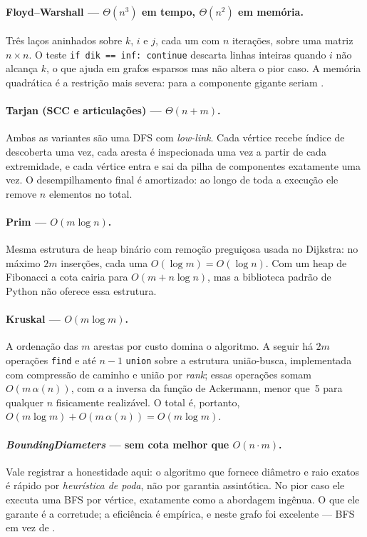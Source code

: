 \documentclass[sigconf]{webmedia}
\begin{document}
\paragraph{Floyd--Warshall --- $\Theta(n^3)$ em tempo, $\Theta(n^2)$ em
memória.} Três laços aninhados sobre $k$, $i$ e $j$, cada um com $n$
iterações, sobre uma matriz $n \times n$. O teste
\texttt{if dik == inf: continue} descarta linhas inteiras quando $i$ não
alcança $k$, o que ajuda em grafos esparsos mas não altera o pior caso.
A memória quadrática é a restrição mais severa: para a componente gigante
seriam \fwMemoria.

\paragraph{Tarjan (SCC e articulações) --- $\Theta(n+m)$.} Ambas as
variantes são uma DFS com \textit{low-link}. Cada vértice recebe índice
de descoberta uma vez, cada aresta é inspecionada uma vez a partir de
cada extremidade, e cada vértice entra e sai da pilha de componentes
exatamente uma vez. O desempilhamento final é amortizado: ao longo de
toda a execução ele remove $n$ elementos no total.

\paragraph{Prim --- $O(m\log n)$.} Mesma estrutura de heap binário com
remoção preguiçosa usada no Dijkstra: no máximo $2m$ inserções, cada uma
$O(\log m) = O(\log n)$. Com um heap de Fibonacci a cota cairia para
$O(m + n\log n)$, mas a biblioteca padrão de Python não oferece essa
estrutura.

\paragraph{Kruskal --- $O(m\log m)$.} A ordenação das $m$ arestas por
custo domina o algoritmo. A seguir há $2m$ operações \texttt{find} e até
$n-1$ \texttt{union} sobre a estrutura união-busca, implementada com
compressão de caminho e união por \textit{rank}; essas operações somam
$O(m\,\alpha(n))$, com $\alpha$ a inversa da função de Ackermann, menor
que~5 para qualquer $n$ fisicamente realizável. O total é, portanto,
$O(m\log m) + O(m\,\alpha(n)) = O(m\log m)$.

\paragraph{\textit{BoundingDiameters} --- sem cota melhor que
$O(n\cdot m)$.} Vale registrar a honestidade aqui: o algoritmo que
fornece diâmetro e raio exatos é rápido por \emph{heurística de poda},
não por garantia assintótica. No pior caso ele executa uma BFS por
vértice, exatamente como a abordagem ingênua. O que ele garante é a
corretude; a eficiência é empírica, e neste grafo foi excelente ---
\bfsDiametro{} BFS em vez de \tamCG{}.
\end{document}
